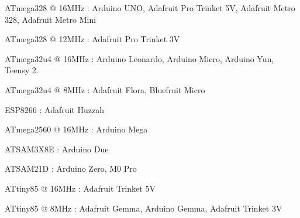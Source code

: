 \begin{DoxyItemize}
\item A\+Tmega328 @ 16\+M\+Hz \+: Arduino U\+NO, Adafruit Pro Trinket 5V, Adafruit Metro 328, Adafruit Metro Mini
\item A\+Tmega328 @ 12\+M\+Hz \+: Adafruit Pro Trinket 3V
\item A\+Tmega32u4 @ 16\+M\+Hz \+: Arduino Leonardo, Arduino Micro, Arduino Yun, Teensy 2.
\item A\+Tmega32u4 @ 8\+M\+Hz \+: Adafruit Flora, Bluefruit Micro
\item E\+S\+P8266 \+: Adafruit Huzzah
\item A\+Tmega2560 @ 16\+M\+Hz \+: Arduino Mega
\item A\+T\+S\+A\+M3\+X8E \+: Arduino Due
\item A\+T\+S\+A\+M21D \+: Arduino Zero, M0 Pro
\item A\+Ttiny85 @ 16\+M\+Hz \+: Adafruit Trinket 5V
\item A\+Ttiny85 @ 8\+M\+Hz \+: Adafruit Gemma, Arduino Gemma, Adafruit Trinket 3V 
\end{DoxyItemize}